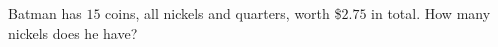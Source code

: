 Batman has $15$ coins, all nickels and quarters, worth \$$2.75$ in total. How many nickels does he have?
